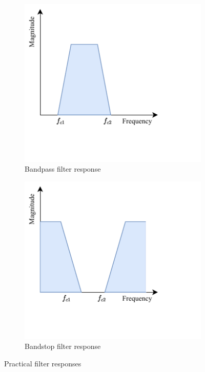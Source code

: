 \begin{figure}[H]
    \begin{subfigure}{0.48\textwidth}
        \centering
        \includegraphics[width=0.7\linewidth]{../Figures/practical_bp}
        \caption{Bandpass filter response}
        \label{fig:practical-c}
    \end{subfigure}
    \begin{subfigure}{0.48\textwidth}
        \centering
        \includegraphics[width=0.7\linewidth]{../Figures/practical_bs}
        \caption{Bandstop filter response}
        \label{fig:practical-d}
    \end{subfigure}
    \caption{Practical filter responses}
    \label{fig:practical}
\end{figure}

